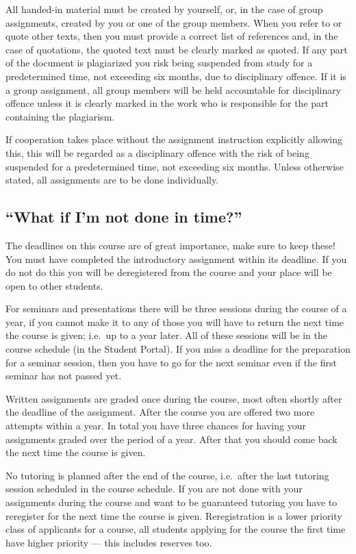 All handed-in material must be created by yourself, or, in the case of group 
assignments, created by you or one of the group members.
When you refer to or quote other texts, then you must provide a correct list of 
references and, in the case of quotations, the quoted text must be clearly 
marked as quoted.
If any part of the document is plagiarized you risk being suspended from study  
for a predetermined time, not exceeding six months, due to disciplinary 
offence.
If it is a group assignment, all group members will be held accountable for 
disciplinary offence unless it is clearly marked in the work who is responsible 
for the part containing the plagiarism.

If cooperation takes place without the assignment instruction explicitly 
allowing this, this will be regarded as a disciplinary offence with the risk of 
being suspended for a predetermined time, not exceeding six months.
Unless otherwise stated, all assignments are to be done individually.

\subsection{\enquote{What if I'm not done in time?}}
\label{sec:late}

The deadlines on this course are of great importance, make sure to keep these!
You must have completed the introductory assignment within its deadline.
If you do not do this you will be deregistered from the course and your place 
will be open to other students.

For seminars and presentations there will be three sessions during the course 
of a year, if you cannot make it to any of those you will have to return the 
next time the course is given; i.e.\ up to a year later.
All of these sessions will be in the course schedule (in the Student Portal).
If you miss a deadline for the preparation for a seminar session, then you have 
to go for the next seminar even if the first seminar has not passed yet.

Written assignments are graded once during the course, most often shortly after 
the deadline of the assignment.
After the course you are offered two more attempts within a year.
In total you have three chances for having your assignments graded over the 
period of a year.
After that you should come back the next time the course is given.

No tutoring is planned after the end of the course, i.e.\ after the last 
tutoring session scheduled in the course schedule.
If you are not done with your assignments during the course and want to be 
guaranteed tutoring you have to reregister for the next time the course is 
given.
Reregistration is a lower priority class of applicants for a course, all 
students applying for the course the first time have higher priority --- this 
includes reserves too.

